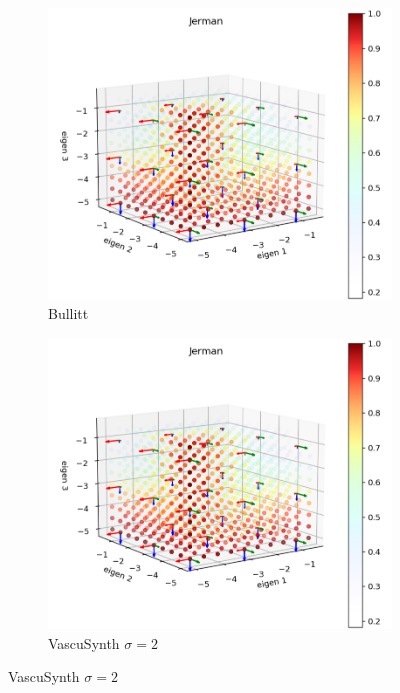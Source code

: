 \begin{figure}[!ht]
  \captionsetup[subfigure]{justification=centering}
  \centering
  \begin{subfigure}[t]{0.45\textwidth}
    \centering
    \includegraphics[width=\textwidth]{Images/Bullitt_Jerman_BP.png}
    \caption{Bullitt}
  \end{subfigure}
  \begin{subfigure}[t]{0.45\textwidth}
    \centering
    \includegraphics[width=\textwidth]{Images/Bullitt_Jerman_BP.png}
    \caption{VascuSynth $\sigma = 2$}
  \end{subfigure}
  

\end{figure}
